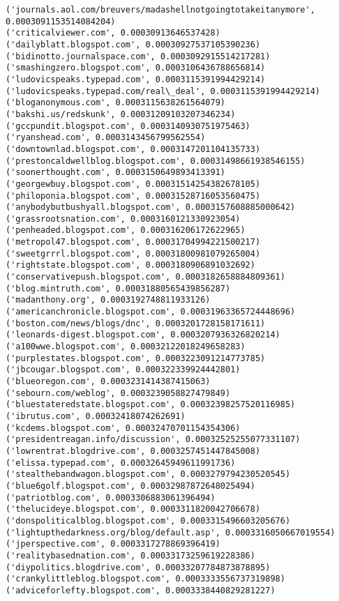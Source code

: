\documentclass[11pt]{article}
\begin{document}
\begin{Verbatim}[commandchars=\\\{\}]
('journals.aol.com/breuvers/madashellnotgoingtotakeitanymore', 0.0003091153514084204)
('criticalviewer.com', 0.00030913646537428)
('dailyblatt.blogspot.com', 0.00030927537105390236)
('bidinotto.journalspace.com', 0.0003092915514217281)
('smashingzero.blogspot.com', 0.0003106436788656814)
('ludovicspeaks.typepad.com', 0.0003115391994429214)
('ludovicspeaks.typepad.com/real\_deal', 0.0003115391994429214)
('bloganonymous.com', 0.0003115638261564079)
('bakshi.us/redskunk', 0.00031209103207346234)
('gccpundit.blogspot.com', 0.0003140930751975463)
('ryanshead.com', 0.0003143456799562554)
('downtownlad.blogspot.com', 0.0003147201104135733)
('prestoncaldwellblog.blogspot.com', 0.00031498661938546155)
('soonerthought.com', 0.0003150649893413391)
('georgewbuy.blogspot.com', 0.00031514254382678105)
('philoponia.blogspot.com', 0.00031528716053560475)
('anybodybutbushyall.blogspot.com', 0.0003157608885000642)
('grassrootsnation.com', 0.0003160121330923054)
('penheaded.blogspot.com', 0.000316206172622965)
('metropol47.blogspot.com', 0.00031704994221500217)
('sweetgrrrl.blogspot.com', 0.00031800981079265004)
('rightstate.blogspot.com', 0.0003180906891032692)
('conservativepush.blogspot.com', 0.0003182658884809361)
('blog.mintruth.com', 0.00031880565439856287)
('madanthony.org', 0.0003192748811933126)
('americanchronicle.blogspot.com', 0.00031963365724448696)
('boston.com/news/blogs/dnc', 0.0003201728158171611)
('leonards-digest.blogspot.com', 0.0003207936326820214)
('a100wwe.blogspot.com', 0.00032122018249658283)
('purplestates.blogspot.com', 0.0003223091214773785)
('jbcougar.blogspot.com', 0.000322339924442801)
('blueoregon.com', 0.0003231414387415063)
('sebourn.com/weblog', 0.0003239058827479849)
('bluestateredstate.blogspot.com', 0.00032398257520116985)
('ibrutus.com', 0.00032418074262691)
('kcdems.blogspot.com', 0.00032470701154354306)
('presidentreagan.info/discussion', 0.00032525255077331107)
('lowrentrat.blogdrive.com', 0.0003257451447845008)
('elissa.typepad.com', 0.00032645949611991736)
('stealthebandwagon.blogspot.com', 0.0003279794230520545)
('blue6golf.blogspot.com', 0.00032987872648025494)
('patriotblog.com', 0.0003306883061396494)
('thelucideye.blogspot.com', 0.0003311820042706678)
('donspoliticalblog.blogspot.com', 0.0003315496603205676)
('lightupthedarkness.org/blog/default.asp', 0.0003316050667019554)
('jperspective.com', 0.0003317278869396419)
('realitybasednation.com', 0.00033173259619228386)
('diypolitics.blogdrive.com', 0.00033207784873878895)
('crankylittleblog.blogspot.com', 0.0003333556737319898)
('adviceforlefty.blogspot.com', 0.0003338440829281227)

\end{Verbatim}
\end{document}
